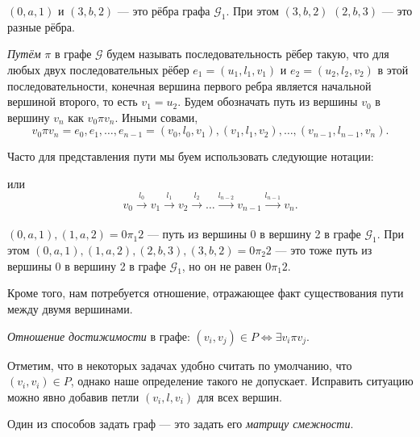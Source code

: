 \begin{example}
$(0,a,1)$  и $(3,b,2)$ --- это рёбра графа $\mathcal{G}_1$. При этом $(3,b,2)$ $(2,b,3)$ --- это разные рёбра.
\end{example}

\begin{definition}
  \textit{Путём} $\pi$ в графе $\mathcal{G}$ будем называть последовательность рёбер такую, что для любых двух последовательных рёбер $e_1=(u_1,l_1,v_1)$ и $e_2=(u_2,l_2,v_2)$ в этой последовательности, конечная вершина первого ребра является начальной вершиной второго, то есть $v_1 = u_2$. Будем обозначать путь из вершины $v_0$ в вершину $v_n$ как $v_0 \pi v_n$. Иными совами, $$v_0 \pi v_n = e_0,e_1, \dots, e_{n-1} = (v_0, l_0, v_1),(v_1,l_1,v_2),\dots,(v_{n-1},l_{n-1},v_n).$$

  Часто для представления пути мы буем использовать следующие нотации:
\begin{center}
  
\end{center}
\end{definition}
 или
$$
v_0 \xrightarrow[]{l_0} v_1 \xrightarrow[]{l_1} v_2 \xrightarrow[]{l_2} \ldots \xrightarrow[]{l_{n-2}} v_{n-1} \xrightarrow[]{l_{n-1}} v_n.
$$

\begin{example}
$(0,a,1),(1,a,2) = 0\pi_1 2$  --- путь из вершины 0 в вершину 2 в графе $\mathcal{G}_1$.
При этом $(0,a,1),(1,a,2),(2,b,3),(3,b,2) = 0\pi_2 2$ --- это тоже путь из вершины 0 в вершину 2 в графе $\mathcal{G}_1$, но он не равен $0\pi_1 2$.
\end{example}

Кроме того, нам потребуется отношение, отражающее факт существования пути между двумя вершинами.

\begin{definition}\label{def:reach}
  \textit{Отношение достижимости} в графе:
  $(v_i,v_j) \in P \iff \exists v_i \pi v_j$.
\end{definition}

Отметим, что в некоторых задачах удобно считать по умолчанию, что $(v_i,v_i) \in P$, однако наше определение такого не допускает. Исправить ситуацию можно явно добавив петли $(v_i,l,v_i)$ для всех вершин.

Один из способов задать граф --- это задать его \textit{матрицу смежности}.

